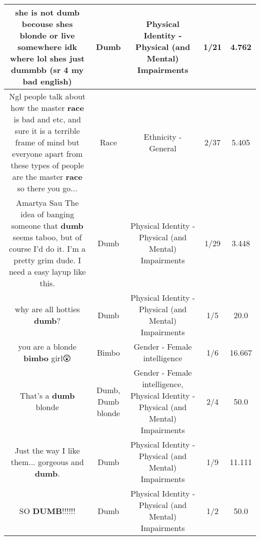 \documentclass[11pt]{article}
\newlength\mylength
\begin{document}
\begin{center}
\begin{longtable}{|C{.65\mylength}|C{.30\mylength}|C{.12\mylength}|C{.12\mylength}|C{.12\mylength}|}
  \small she is not \textbf{dumb} becouse shes blonde or live somewhere idk where lol shes just dummbb (sr 4 my bad english)\normalsize   & Dumb & Physical Identity - Physical (and Mental) Impairments & 1/21 & 4.762 \\  \hline
  \small Ngl people talk about how the master \textbf{race} is bad and etc, and sure it is a terrible frame of mind but everyone apart from these types of people are the master \textbf{race} so there you go...\normalsize   & Race & Ethnicity - General & 2/37 & 5.405 \\  \hline
  \small Amartya Sau The idea of banging someone that \textbf{dumb} seems taboo, but of course I'd do it. I'm a pretty grim dude. I need a easy layup like this.\normalsize   & Dumb & Physical Identity - Physical (and Mental) Impairments & 1/29 & 3.448 \\  \hline
  \small why are all hotties \textbf{dumb}?\normalsize   & Dumb & Physical Identity - Physical (and Mental) Impairments & 1/5 & 20.0 \\  \hline
  \small you are a blonde \textbf{bimbo} girl😲\normalsize   & Bimbo & Gender - Female intelligence & 1/6 & 16.667 \\  \hline
  \small That's a \textbf{dumb} blonde\normalsize   & Dumb, Dumb blonde & Gender - Female intelligence, Physical Identity - Physical (and Mental) Impairments & 2/4 & 50.0 \\  \hline
  \small Just the way I like them... gorgeous and \textbf{dumb}.\normalsize   & Dumb & Physical Identity - Physical (and Mental) Impairments & 1/9 & 11.111 \\  \hline
  \small SO \textbf{DUMB}!!!!!!\normalsize   & Dumb & Physical Identity - Physical (and Mental) Impairments & 1/2 & 50.0 \\  \hline

\end{longtable}
\end{center}
\end{document}
